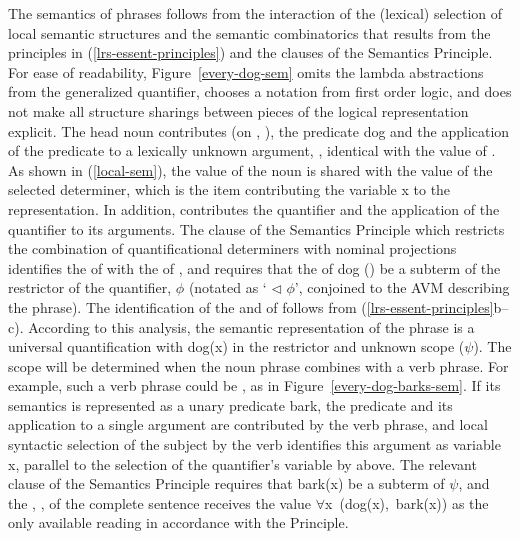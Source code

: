 \documentclass[output=paper]{langsci/langscibook}
\begin{document}
The semantics of phrases follows from the interaction of the (lexical) selection of local semantic structures and the semantic combinatorics that results from the principles in (\ref{lrs-essent-principles}) and the clauses of the Semantics Principle.
For ease of readability, Figure~\ref{every-dog-sem} omits the lambda abstractions from the generalized quantifier, chooses a notation from first order logic, and does not make all structure sharings between pieces of the logical representation explicit. The head noun  contributes (on , ), the predicate {\normalfont \sffamily dog} and the application of the predicate to a lexically unknown argument, , identical with the  value of . As shown in (\ref{local-sem}), the  value of the noun is shared with the  value of the selected determiner, which is the item contributing the variable {\normalfont \sffamily x} to the representation. In addition,  contributes the quantifier and the application of the quantifier to its arguments. The clause of the Semantics Principle which restricts the combination of quantificational determiners with nominal projections identifies the  of  with the  of , and requires that the  of dog () be a subterm of the restrictor of the quantifier, $\phi$ (notated as ` $\triangleleft$ $\phi$', conjoined to the AVM describing the phrase). The identification of the  and  of  follows from (\ref{lrs-essent-principles}b--c). According to this analysis, the semantic representation of the phrase  is a universal quantification with {\normalfont \sffamily dog(x)} in the restrictor and unknown scope ($\psi$). The scope will be determined when the noun phrase combines with a verb phrase. For example, such a verb phrase could be , as in  Figure~\ref{every-dog-barks-sem}. If its semantics is represented as a unary predicate {\normalfont \sffamily bark}, the predicate and its application to a single argument are contributed by the verb phrase, and local syntactic selection of the subject  by the verb  identifies this argument as variable {\normalfont \sffamily x}, parallel to the selection of the quantifier's variable by  above. The relevant clause of the Semantics Principle requires that {\normalfont \sffamily bark(x)} be a subterm of $\psi$, and the , , of the complete sentence receives the value \mbox{\normalfont \sffamily $\forall$x (dog(x), bark(x))} as the only available reading in accordance with the  Principle. %
\end{document}
